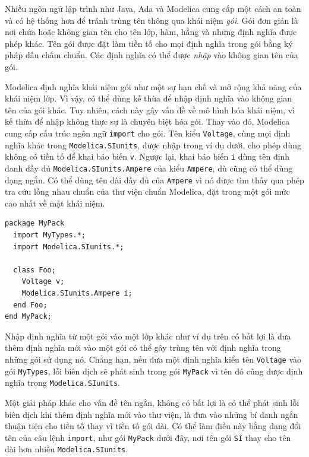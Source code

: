 Nhiều ngôn ngữ lập trình như Java, Ada và Modelica cung cấp một cách an toàn và có hệ thống hơn để tránh trùng tên thông qua khái niệm \emph{gói}. Gói đơn giản là nơi chứa hoặc không gian tên cho tên lớp, hàm, hằng và những định nghĩa được phép khác. Tên gói được đặt làm tiền tố cho mọi định nghĩa trong gói bằng ký pháp dấu chấm chuẩn. Các định nghĩa có thể được \emph{nhập} vào không gian tên của gói.

Modelica định nghĩa khái niệm gói như một sự hạn chế và mở rộng khả năng của khái niệm lớp. Vì vậy, có thể dùng kế thừa để nhập định nghĩa vào không gian tên của gói khác. Tuy nhiên, cách này gây vấn đề về mô hình hóa khái niệm, vì kế thừa để nhập không thực sự là chuyên biệt hóa gói. Thay vào đó, Modelica cung cấp cấu trúc ngôn ngữ \texttt{import} cho gói. Tên kiểu \texttt{Voltage}, cùng mọi định nghĩa khác trong \texttt{Modelica.SIunits}, được nhập trong ví dụ dưới, cho phép dùng không có tiền tố để khai báo biến \texttt{v}. Ngược lại, khai báo biến \texttt{i} dùng tên định danh đầy đủ \texttt{Modelica.SIunits.Ampere} của kiểu \texttt{Ampere}, dù cũng có thể dùng dạng ngắn. Có thể dùng tên dài đầy đủ của \texttt{Ampere} vì nó được tìm thấy qua phép tra cứu lồng nhau chuẩn của thư viện chuẩn Modelica, đặt trong một gói mức cao nhất về mặt khái niệm.
\begin{verbatim}
package MyPack
  import MyTypes.*;
  import Modelica.SIunits.*;

  class Foo;
    Voltage v;
    Modelica.SIunits.Ampere i;
  end Foo;
end MyPack;
\end{verbatim}
Nhập định nghĩa từ một gói vào một lớp khác như ví dụ trên có bất lợi là đưa thêm định nghĩa mới vào một gói có thể gây trùng tên với định nghĩa trong những gói sử dụng nó. Chẳng hạn, nếu đưa một định nghĩa kiểu tên \texttt{Voltage} vào gói \texttt{MyTypes}, lỗi biên dịch sẽ phát sinh trong gói \texttt{MyPack} vì tên đó cũng được định nghĩa trong \texttt{Modelica.SIunits}.

Một giải pháp khác cho vấn đề tên ngắn, không có bất lợi là có thể phát sinh lỗi biên dịch khi thêm định nghĩa mới vào thư viện, là đưa vào những bí danh ngắn thuận tiện cho tiền tố thay vì tiền tố gói dài. Có thể làm điều này bằng dạng đổi tên của câu lệnh \texttt{import}, như gói \texttt{MyPack} dưới đây, nơi tên gói \texttt{SI} thay cho tên dài hơn nhiều \texttt{Modelica.SIunits}.


